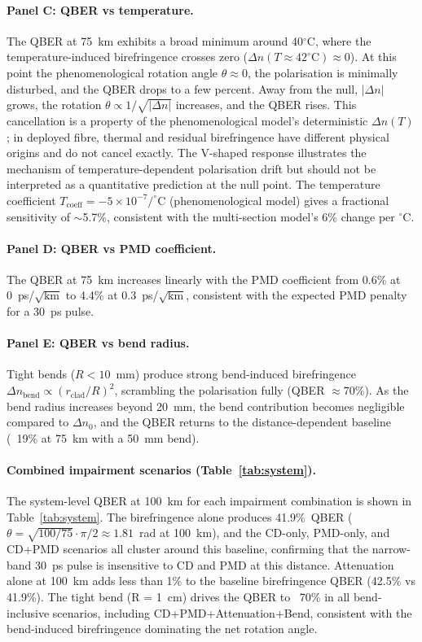 \documentclass[3p,times,preprint]{elsarticle}
\begin{document}
\paragraph{Panel C: QBER vs temperature.}
The QBER at 75~km exhibits a broad minimum around 40$^\circ$C,
where the temperature-induced birefringence crosses zero
($\Delta n(T \approx 42^\circ\text{C}) \approx 0$).  At this point
the phenomenological rotation angle $\theta \approx 0$, the
polarisation is minimally disturbed, and the QBER drops to a few
percent.  Away from the null, $|\Delta n|$ grows, the rotation
$\theta \propto 1/\sqrt{|\Delta n|}$ increases, and the QBER rises.
This cancellation is a property of the phenomenological model's
deterministic $\Delta n(T)$; in deployed fibre, thermal and residual
birefringence have different physical origins and do not cancel
exactly.  The V-shaped response illustrates the mechanism of
temperature-dependent polarisation drift but should not be
interpreted as a quantitative prediction at the null point.
The temperature coefficient
$T_{\text{coeff}} = -5\times10^{-7}/^\circ$C (phenomenological model)
gives a fractional sensitivity of $\sim$5.7\%, consistent with the
multi-section model's 6\% change per $^\circ$C.

\paragraph{Panel D: QBER vs PMD coefficient.}
The QBER at 75~km increases linearly with the PMD coefficient from
0.6\% at 0~ps/$\sqrt{\text{km}}$ to 4.4\% at
0.3~ps/$\sqrt{\text{km}}$, consistent with the expected PMD penalty
for a 30~ps pulse.

\paragraph{Panel E: QBER vs bend radius.}
Tight bends ($R < 10$~mm) produce strong bend-induced birefringence
$\Delta n_{\text{bend}} \propto (r_{\text{clad}}/R)^2$, scrambling
the polarisation fully (QBER $\approx 70\%$).  As the
bend radius increases beyond 20~mm, the bend contribution becomes
negligible compared to $\Delta n_0$, and the QBER returns to the
distance-dependent baseline (~19\% at 75~km with a 50~mm bend).

\paragraph{Combined impairment scenarios (Table~\ref{tab:system}).}
The system-level QBER at 100~km for each impairment combination is
shown in Table~\ref{tab:system}.  The birefringence alone produces
41.9\%~QBER ($\theta = \sqrt{100/75}\cdot\pi/2 \approx 1.81$~rad at
100~km), and the CD-only, PMD-only, and CD+PMD scenarios all cluster
around this baseline, confirming that the narrow-band 30~ps pulse is
insensitive to CD and PMD at this distance.  Attenuation alone at
100~km adds less than 1\% to the baseline birefringence QBER (42.5\%
vs 41.9\%).  The tight bend (R = 1~cm) drives the QBER to ~70\% in
all bend-inclusive scenarios, including
CD+PMD+Attenuation+Bend, consistent with the bend-induced
birefringence dominating the net rotation angle.
\end{document}

